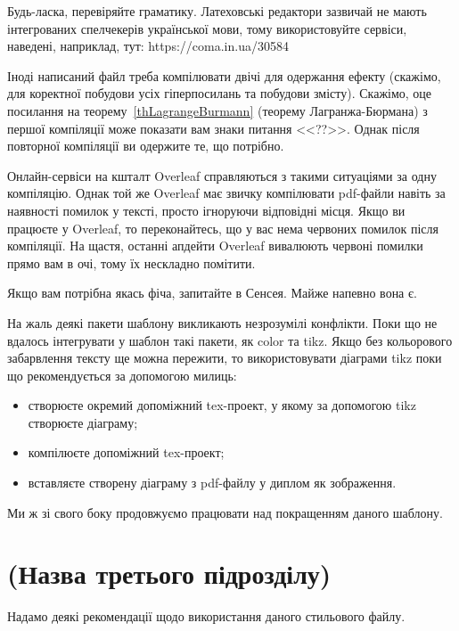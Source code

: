 \begin{corollary} \par %
Будь-ласка, перевіряйте граматику. Латеховські редактори зазвичай не мають
інтегрованих спелчекерів української мови, тому використовуйте сервіси,
наведені, наприклад, тут: https://coma.in.ua/30584
\end{corollary}

Іноді написаний файл треба компілювати двічі для одержання ефекту
(скажімо, для коректної побудови усіх гіперпосилань та побудови змісту).
Скажімо, оце посилання на теорему~\ref{thLagrangeBurmann} (теорему
Лагранжа-Бюрмана) з першої компіляції може показати вам знаки питання
<<??>>. Однак після повторної компіляції ви одержите те, що потрібно.

Онлайн-сервіси на кшталт Overleaf справляються з такими ситуаціями за одну компіляцію. Однак той
же Overleaf має звичку компілювати pdf-файли навіть за наявності помилок у
тексті, просто ігноруючи відповідні місця. Якщо ви працюєте у Overleaf,
то переконайтесь, що у вас нема червоних помилок після компіляції. На
щастя, останні апдейти Overleaf вивалюють червоні помилки прямо вам в очі,
тому їх нескладно помітити.

Якщо вам потрібна якась фіча, запитайте в Сенсея. Майже напевно вона є.

На жаль деякі пакети шаблону викликають незрозумілі конфлікти. Поки що не
вдалось інтегрувати у шаблон такі пакети, як color та tikz. Якщо без
кольорового забарвлення тексту ще можна пережити, то використовувати
діаграми tikz поки що рекомендується за допомогою милиць:

\begin{itemize}
\item створюєте окремий допоміжний tex-проект, у якому за допомогою tikz створюєте
діаграму;
\item компілюєте допоміжний tex-проект;
\item вставляєте створену діаграму з pdf-файлу у диплом як зображення.
\end{itemize}

Ми ж зі свого боку продовжуємо працювати над покращенням даного шаблону.

\section{(Назва третього підрозділу)}


Надамо деякі рекомендації щодо використання даного стильового файлу.

